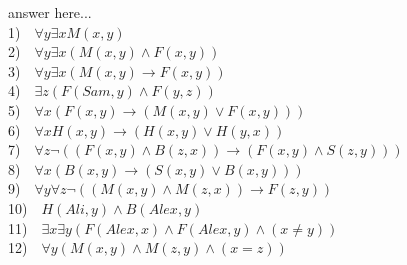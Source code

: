 \documentclass[a4paper,12pt]{article}
\begin{document}
\begin{tcolorbox}
answer here...\\
1)$\quad\forall y \exists x M(x,y)$\\
2)$\quad\forall y \exists x (M(x,y)\land F(x,y))$\\
3)$\quad\forall y \exists x(M(x,y)\rightarrow F(x,y))$\\
4)$\quad\exists z(F(Sam,y)\land F(y,z))$\\
5)$\quad\forall x (F(x,y)\rightarrow(M(x,y)\lor F(x,y)))$\\
6)$\quad\forall x H(x,y)\rightarrow(H(x,y)\lor H(y,x))$\\
7)$\quad\forall z\neg((F(x,y)\land B(z,x))\rightarrow(F(x,y)\land S(z,y)))$\\
8)$\quad\forall x (B(x,y)\rightarrow (S(x,y)\lor B(x,y)))$\\
9)$\quad\forall y\forall z \neg((M(x,y)\land M(z,x))\rightarrow F(z,y))$\\
10)$\quad H(Ali,y)\land B(Alex,y)$\\
11)$\quad\exists x \exists y (F(Alex,x)\land F(Alex,y)\land (x\neq y))$\\
12)$\quad\forall y (M(x,y)\land M(z,y)\land (x=z))$\\
\vspace{1cm} %
\end{tcolorbox}


\newpage
\end{document}
